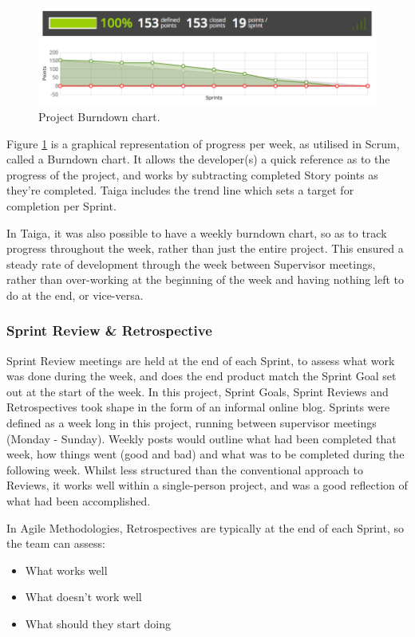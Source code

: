 \begin{figure}[H]
  \centering
  \includegraphics[width=\textwidth]{Chapter2/software-img/burndown.png}
  \caption{Project Burndown chart.}
  \label{fig:burndown}
\end{figure}

Figure \ref{fig:burndown} is a graphical representation of progress per week, as utilised in Scrum, called a Burndown chart. It allows the developer(s) a quick reference as to the progress of the project, and works by subtracting completed Story points as they're completed. Taiga includes the trend line which sets a target for completion per Sprint.

In Taiga, it was also possible to have a weekly burndown chart, so as to track progress throughout the week, rather than just the entire project. This ensured a steady rate of development through the week between Supervisor meetings, rather than over-working at the beginning of the week and having nothing left to do at the end, or vice-versa.

\subsubsection{Sprint Review \& Retrospective}

Sprint Review meetings are held at the end of each Sprint, to assess what work was done during the week, and does the end product match the Sprint Goal set out at the start of the week. In this project, Sprint Goals, Sprint Reviews and Retrospectives took shape in the form of an informal online blog. Sprints were defined as a week long in this project, running between supervisor meetings (Monday - Sunday). Weekly posts would outline what had been completed that week, how things went (good and bad) and what was to be completed during the following week. Whilst less structured than the conventional approach to Reviews, it works well within a single-person project, and was a good reflection of what had been accomplished.

In Agile Methodologies, Retrospectives are typically at the end of each Sprint, so the team can assess:
\begin{itemize}
  \item What works well
  \item What doesn't work well
  \item What should they start doing
\end{itemize}

